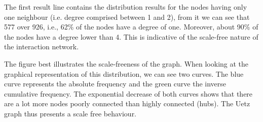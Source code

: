The first result line contains the distribution results for the nodes
having only one neighbour (i.e. degree comprised between 1 and 2),
from it we can see that 577 over 926, i.e., 62\% of the nodes have a
degree of one.  Moreover, about 90\% of the nodes have a degree lower
than 4. This is indicative of the scale-free nature of the interaction
network.

The figure best illustrates the scale-freeness of the graph.  When
looking at the graphical representation of this distribution, we can
see two curves.  The blue curve represents the absolute frequency and
the green curve the inverse cumulative frequency.  The exponential
decrease of both curves shows that there are a lot more nodes poorly
connected than highly connected (hubs). The Uetz graph thus presents a
scale free behaviour.
